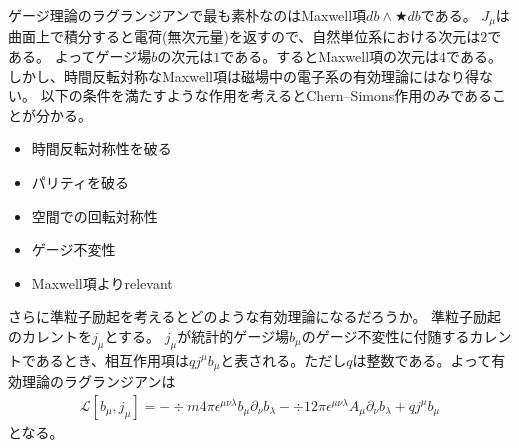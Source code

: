 \documentclass[\main/main.tex]{subfiles}
\begin{document}
\begin{frame}{\currentname}
    ゲージ理論のラグランジアンで最も素朴なのはMaxwell項$ 𝑑b ∧ ★𝑑b$である。
    $J_μ$は曲面上で積分すると電荷(無次元量)を返すので、自然単位系における次元は$2$である。
    よってゲージ場$b$の次元は$1$である。するとMaxwell項の次元は$4$である。
    しかし、時間反転対称なMaxwell項は磁場中の電子系の有効理論にはなり得ない。
    以下の条件を満たすような作用を考えるとChern--Simons作用のみであることが分かる。
    \begin{itemize}
        \item 時間反転対称性を破る 
        \item パリティを破る
        \item 空間での回転対称性
        \item ゲージ不変性
        \item Maxwell項よりrelevant
    \end{itemize}
    さらに準粒子励起を考えるとどのような有効理論になるだろうか。
    準粒子励起のカレントを$j_μ$とする。
    $j_μ$が統計的ゲージ場$b_μ$のゲージ不変性に付随するカレントであるとき、相互作用項は$qj^μb_μ$と表される。ただし$q$は整数である。よって有効理論のラグランジアンは
    \begin{align}
        ℒ[b_μ,j_μ] = -÷{m}{4π}ϵ^{μνλ}b_μ∂_νb_λ - ÷{1}{2π}ϵ^{μνλ}A_μ∂_νb_λ + qj^μb_μ
    \end{align}
    となる。
\end{frame}
\end{document}
